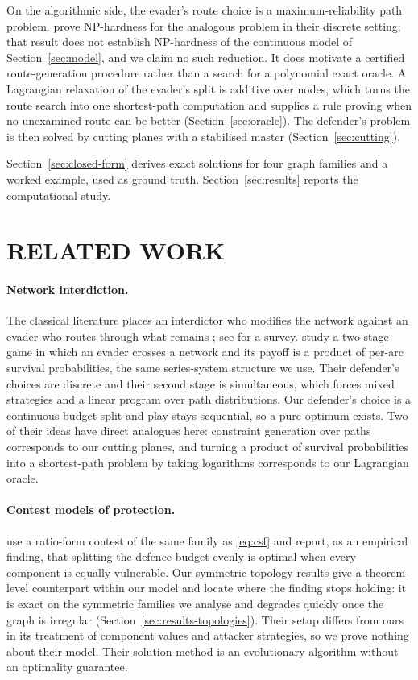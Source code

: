 \documentclass[10pt,a4paper,twoside]{article}
\theoremstyle{plain}
\theoremstyle{definition}
\begin{document}
On the algorithmic side, the evader's route choice is a maximum-reliability
path problem. \citet{nguyen2023} prove NP-hardness for the analogous problem
in their discrete setting; that result does not establish NP-hardness of the
continuous model of Section~\ref{sec:model}, and we claim no such reduction.
It does motivate a certified route-generation procedure rather than a search
for a polynomial exact oracle. A Lagrangian relaxation of the evader's split
is additive over nodes, which turns the route search into one shortest-path
computation and supplies a rule proving when no unexamined route can be
better (Section~\ref{sec:oracle}). The defender's problem is then solved by
cutting planes with a stabilised master (Section~\ref{sec:cutting}).

Section~\ref{sec:closed-form} derives exact solutions for four graph families
and a worked example, used as ground truth. Section~\ref{sec:results} reports
the computational study.

\section{RELATED WORK}
\label{sec:related}

\paragraph{Network interdiction.}
The classical literature places an interdictor who modifies the network
against an evader who routes through what remains
\citep{washburn1995,israeli2002}; see \citet{smith2020} for a survey.
\citet{nguyen2023} study a two-stage game in which an evader crosses a
network and its payoff is a product of per-arc survival probabilities, the
same series-system structure we use. Their defender's choices are discrete
and their second stage is simultaneous, which forces mixed strategies and a
linear program over path distributions. Our defender's choice is a continuous
budget split and play stays sequential, so a pure optimum exists. Two of
their ideas have direct analogues here: constraint generation over paths
corresponds to our cutting planes, and turning a product of survival
probabilities into a shortest-path problem by taking logarithms corresponds
to our Lagrangian oracle.

\paragraph{Contest models of protection.}
\citet{ramirez2011} use a ratio-form contest of the same family as
\eqref{eq:csf} and report, as an empirical finding, that splitting the
defence budget evenly is optimal when every component is equally vulnerable.
Our symmetric-topology results give a theorem-level counterpart within our
model and locate where the finding stops holding: it is exact on the
symmetric families we analyse and degrades quickly once the graph is
irregular (Section~\ref{sec:results-topologies}). Their setup differs from
ours in its treatment of component values and attacker strategies, so we
prove nothing about their model. Their solution method is an evolutionary
algorithm without an optimality guarantee.
\end{document}
